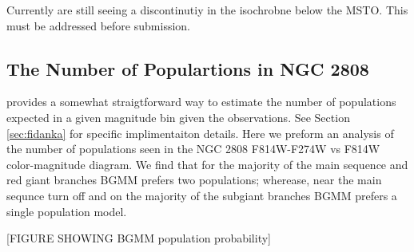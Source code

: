 {\color{blue} Currently are still seeing a discontinutiy in the isochrobne below the MSTO. This must be addressed before submission.}

\subsection{The Number of Populartions in NGC 2808}
\fidanka provides a somewhat straigtforward way to estimate the number of populations expected in a given magnitude bin given the observations. See Section \ref{sec:fidanka} for specific implimentaiton details. Here we preform an analysis of the number of populations seen in the NGC 2808 F814W-F274W vs F814W color-magnitude diagram. We find that for the majority of the main sequence and red giant branches BGMM prefers two populations; wherease, near the main sequnce turn off and on the majority of the subgiant branches BGMM prefers a single population model.

{\color{red}[FIGURE SHOWING BGMM population probability]}

